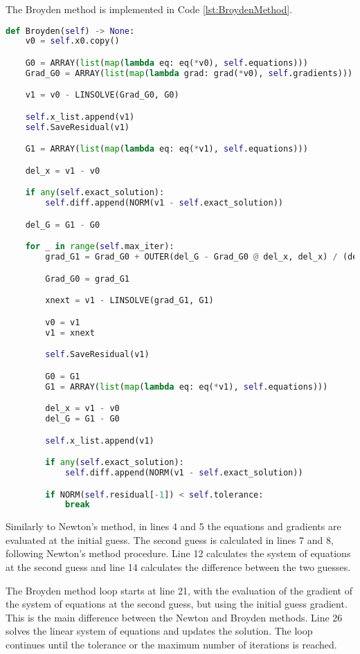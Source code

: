 The Broyden method is implemented in Code \ref{lst:BroydenMethod}.
\begin{lstlisting}[language=Python, caption=Broyden method implementation, label=lst:BroydenMethod]
def Broyden(self) -> None:
    v0 = self.x0.copy()

    G0 = ARRAY(list(map(lambda eq: eq(*v0), self.equations)))
    Grad_G0 = ARRAY(list(map(lambda grad: grad(*v0), self.gradients)))

    v1 = v0 - LINSOLVE(Grad_G0, G0)

    self.x_list.append(v1)
    self.SaveResidual(v1)

    G1 = ARRAY(list(map(lambda eq: eq(*v1), self.equations)))

    del_x = v1 - v0 

    if any(self.exact_solution):
        self.diff.append(NORM(v1 - self.exact_solution))

    del_G = G1 - G0

    for _ in range(self.max_iter):
        grad_G1 = Grad_G0 + OUTER(del_G - Grad_G0 @ del_x, del_x) / (del_x @ del_x)

        Grad_G0 = grad_G1

        xnext = v1 - LINSOLVE(grad_G1, G1)

        v0 = v1 
        v1 = xnext

        self.SaveResidual(v1)

        G0 = G1
        G1 = ARRAY(list(map(lambda eq: eq(*v1), self.equations)))

        del_x = v1 - v0
        del_G = G1 - G0

        self.x_list.append(v1)

        if any(self.exact_solution):
            self.diff.append(NORM(v1 - self.exact_solution))

        if NORM(self.residual[-1]) < self.tolerance:
            break
\end{lstlisting}

Similarly to Newton's method, in lines 4 and 5 the equations and gradients are evaluated at the initial guess. The second guess is calculated in lines 7 and 8, following Newton's method procedure. Line 12 calculates the system of equations at the second guess and line 14 calculates the difference between the two guesses. 

The Broyden method loop starts at line 21, with the evaluation of the gradient of the system of equations at the second guess, but using the initial guess gradient. This is the main difference between the Newton and Broyden methods. Line 26 solves the linear system of equations and updates the solution. The loop continues until the tolerance or the maximum number of iterations is reached.

